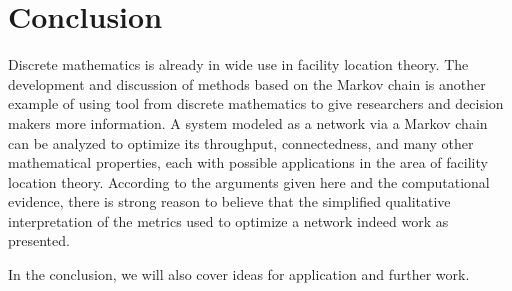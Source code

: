 \documentclass[twoside,twocolumn]{article}
\begin{document}




\section{Conclusion}

Discrete mathematics is already in wide use in facility location theory. %
The development and discussion of methods based on the Markov chain is another example of using tool from discrete mathematics to give researchers and decision makers more information.
A system modeled as a network via a Markov chain can be analyzed to optimize its throughput, connectedness, and many other mathematical properties, each with possible applications in the area of facility location theory.
According to the arguments given here and the computational evidence, there is strong reason to believe that the simplified qualitative interpretation of the metrics used to optimize a network indeed work as presented.

In the conclusion, we will also cover ideas for application and further work.






\end{document}
